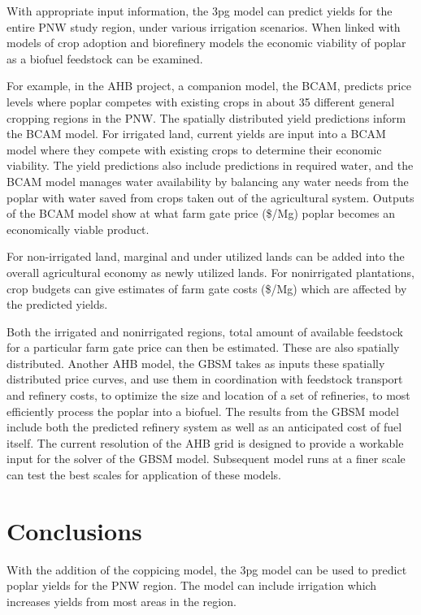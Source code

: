\documentclass[preprint,12pt]{elsarticle}
\begin{document}
With appropriate input information, the \ac{3pg} model can predict
yields for the entire \ac{PNW} study region, under various irrigation
scenarios.  When linked with models of crop adoption and biorefinery
models the economic viability of poplar as a biofuel feedstock can be
examined.
 
For example, in the \ac{AHB} project, a companion model, the
\acf{BCAM}, predicts price levels where poplar competes with existing
crops in about 35 different general cropping regions in the \ac{PNW}.
The spatially distributed yield predictions inform the \ac{BCAM}
model.  For irrigated land, current yields are input into a \ac{BCAM}
model where they compete with existing crops to determine their
economic viability.  The yield predictions also include predictions in
required water, and the \ac{BCAM} model manages water availability by
balancing any water needs from the poplar with water saved from crops
taken out of the agricultural system.  Outputs of the \ac{BCAM} model
show at what farm gate price (\$/Mg) poplar becomes an economically
viable product.
 
For non-irrigated land, marginal and under utilized lands can be added
into the overall agricultural economy as newly utilized lands.  For
nonirrigated plantations, crop budgets can give estimates of farm gate
costs (\$/Mg) which are affected by the predicted yields.

Both the irrigated and nonirrigated regions, total amount of available
feedstock for a particular farm gate price can then be estimated.
These are also spatially distributed.  Another \ac{AHB} model, the
\acf{GBSM} takes as inputs these spatially distributed price curves,
and use them in coordination with feedstock transport and refinery
costs, to optimize the size and location of a set of refineries, to
most efficiently process the poplar into a biofuel.  The results from
the \ac{GBSM} model include both the predicted refinery system as well
as an anticipated cost of fuel itself.  The current resolution of the
\ac{AHB} grid is designed to provide a workable input for the solver
of the \ac{GBSM} model.  Subsequent model runs at a finer scale can
test the best scales for application of these models.

\section{Conclusions}
\label{sec:conclude}

With the addition of the coppicing model, the \ac{3pg} model can be
used to predict poplar yields for the \ac{PNW} region.  The model can
include irrigation which increases yields from most areas in the region.  
\end{document}
